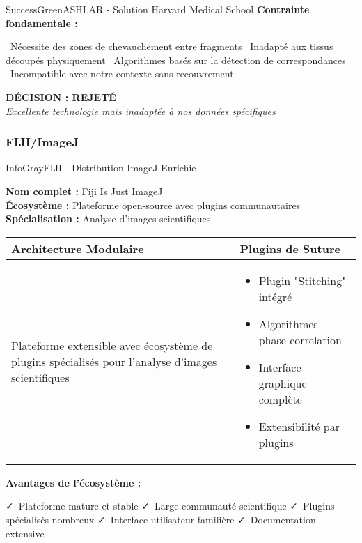 \documentclass[12pt,a4paper]{report}
\newcommand{\pro}[1]{\textcolor{SuccessGreen}{\faCheck\ #1}}
\newcommand{\con}[1]{\textcolor{DangerRed}{\faTimes\ #1}}
\begin{document}
\begin{}
\begin{}
\begin{}
\begin{techbox}{SuccessGreen}{ASHLAR - Solution Harvard Medical School}
\textbf{Contrainte fondamentale :}
\begin{itemize}[leftmargin=*]
    \con{Nécessite des zones de chevauchement entre fragments}
    \con{Inadapté aux tissus découpés physiquement}
    \con{Algorithmes basés sur la détection de correspondances}
    \con{Incompatible avec notre contexte sans recouvrement}
\end{itemize}

\begin{center}
\textbf{\textcolor{WarningOrange}{DÉCISION : REJETÉ}}\\
\textit{Excellente technologie mais inadaptée à nos données spécifiques}
\end{center}

\end{techbox}

\subsubsection{FIJI/ImageJ}

\begin{techbox}{InfoGray}{FIJI - Distribution ImageJ Enrichie}

\textbf{Nom complet :} Fiji Is Just ImageJ \\
\textbf{Écosystème :} Plateforme open-source avec plugins communautaires \\
\textbf{Spécialisation :} Analyse d'images scientifiques

\vspace{0.5cm}

\begin{tabularx}{\textwidth}{|X|X|}
\hline
\rowcolor{LightGray}
\textbf{Architecture Modulaire} & \textbf{Plugins de Suture} \\
\hline
Plateforme extensible avec écosystème de plugins spécialisés pour l'analyse d'images scientifiques &
\begin{itemize}[nosep]
\item Plugin "Stitching" intégré
\item Algorithmes phase-correlation
\item Interface graphique complète
\item Extensibilité par plugins
\end{itemize} \\
\hline
\end{tabularx}

\vspace{0.5cm}

\textbf{Avantages de l'écosystème :}
\begin{itemize}[leftmargin=*]
    \pro{Plateforme mature et stable}
    \pro{Large communauté scientifique}
    \pro{Plugins spécialisés nombreux}
    \pro{Interface utilisateur familière}
    \pro{Documentation extensive}
\end{itemize}


\end{techbox}
\end{}
\end{}
\end{}
\end{document}
